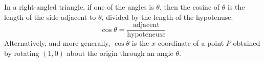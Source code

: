 In a right-angled triangle, if one of the angles is $\theta$, then
the cosine of $\theta$ is the length of the side adjacent to $\theta$,
divided by the length of the hypotenuse.
$$
\cos \theta = \frac{\mbox{adjacent}}{\mbox{hypoteneuse}}
$$
Alternatively, and more generally, $\cos \theta$ is the $x$ coordinate
of a point $P$ obtained by rotating $(1,0)$
about the origin through an angle $\theta$.
